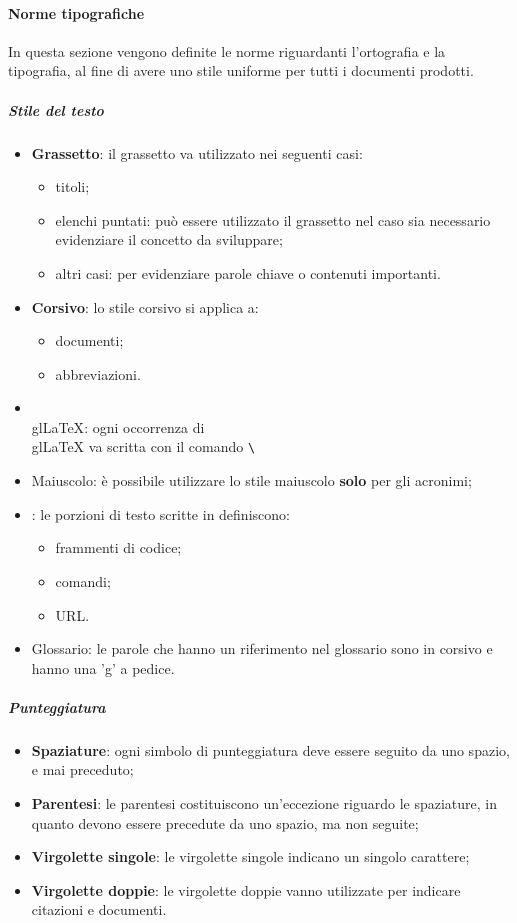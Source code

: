 	\paragraph{Norme tipografiche}
	In questa sezione vengono definite le norme riguardanti l'ortografia e la tipografia, al fine di avere uno stile uniforme per tutti i documenti prodotti.
	\subparagraph{Stile del testo}
		\begin{itemize}
			\item \textbf{Grassetto}: il grassetto va utilizzato nei seguenti casi:
			\begin{itemize}
				\item titoli;
				\item elenchi puntati: può essere utilizzato il grassetto nel caso sia necessario evidenziare il concetto da sviluppare;
				\item altri casi: per evidenziare parole chiave o contenuti importanti.
			\end{itemize}
			\item \textbf{Corsivo}: lo stile corsivo si applica a:
			\begin{itemize}
				\item documenti;
				\item abbreviazioni.
			\end{itemize}
			\item \: ogni occorrenza di \\gl{LaTeX}{} va scritta con il comando \texttt{\textbackslash \gl{LaTeX}}
			\item Maiuscolo: è possibile utilizzare lo stile maiuscolo \textbf{solo} per gli acronimi;
			\item {}: le porzioni di testo scritte in  definiscono:
			\begin{itemize}
				\item frammenti di codice;
				\item comandi;
				\item URL.
			\end{itemize} 
			\item Glossario: le parole che hanno un riferimento nel glossario sono in corsivo e hanno una 'g' a pedice.
		\end{itemize}
	\subparagraph{Punteggiatura}
		\begin{itemize}
			\item \textbf{Spaziature}: ogni simbolo di punteggiatura deve essere seguito da uno spazio, e mai preceduto;
			\item \textbf{Parentesi}: le parentesi costituiscono un'eccezione riguardo le spaziature, in quanto devono essere precedute da uno spazio, ma non seguite;
			\item \textbf{Virgolette singole}: le virgolette singole indicano un singolo carattere;
			\item \textbf{Virgolette doppie}: le virgolette doppie vanno utilizzate per indicare citazioni e documenti.
		\end{itemize}
